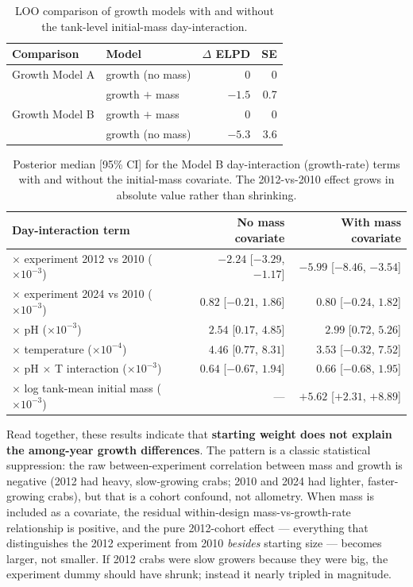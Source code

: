 \documentclass[11pt]{article}
\begin{document}
\begin{table}[h]
\centering\small
\begin{tabular}{llrr}
\toprule
Comparison & Model & $\Delta$ ELPD & SE \\
\midrule
Growth Model A & growth (no mass) & 0 & 0 \\
                & growth $+$ mass & $-1.5$ & 0.7 \\
\midrule
Growth Model B & growth $+$ mass & 0 & 0 \\
                & growth (no mass) & $-5.3$ & 3.6 \\
\bottomrule
\end{tabular}
\caption{LOO comparison of growth models with and without the tank-level initial-mass day-interaction.}
\label{tab:loo-growth-mass}
\end{table}

\begin{table}[h]
\centering\small
\begin{tabular}{lrr}
\toprule
Day-interaction term & No mass covariate & With mass covariate \\
\midrule
$\times$ experiment 2012 vs 2010 ($\times 10^{-3}$) & $-2.24$ [$-3.29$, $-1.17$] & $-5.99$ [$-8.46$, $-3.54$] \\
$\times$ experiment 2024 vs 2010 ($\times 10^{-3}$) & $0.82$ [$-0.21$, $1.86$] & $0.80$ [$-0.24$, $1.82$] \\
$\times$ pH ($\times 10^{-3}$) & $2.54$ [$0.17$, $4.85$] & $2.99$ [$0.72$, $5.26$] \\
$\times$ temperature ($\times 10^{-4}$) & $4.46$ [$0.77$, $8.31$] & $3.53$ [$-0.32$, $7.52$] \\
$\times$ pH $\times$ T interaction ($\times 10^{-3}$) & $0.64$ [$-0.67$, $1.94$] & $0.66$ [$-0.68$, $1.95$] \\
$\times$ log tank-mean initial mass ($\times 10^{-3}$) & --- & $+5.62$ [$+2.31$, $+8.89$] \\
\bottomrule
\end{tabular}
\caption{Posterior median [95\% CI] for the Model B day-interaction (growth-rate) terms with and without the initial-mass covariate. The 2012-vs-2010 effect grows in absolute value rather than shrinking.}
\label{tab:growth-mass-compare}
\end{table}

Read together, these results indicate that \textbf{starting weight does not explain the among-year growth differences}. The pattern is a classic statistical suppression: the raw between-experiment correlation between mass and growth is negative (2012 had heavy, slow-growing crabs; 2010 and 2024 had lighter, faster-growing crabs), but that is a cohort confound, not allometry. When mass is included as a covariate, the residual within-design mass-vs-growth-rate relationship is positive, and the pure 2012-cohort effect --- everything that distinguishes the 2012 experiment from 2010 \textit{besides} starting size --- becomes larger, not smaller. If 2012 crabs were slow growers because they were big, the experiment dummy should have shrunk; instead it nearly tripled in magnitude.
\end{document}
